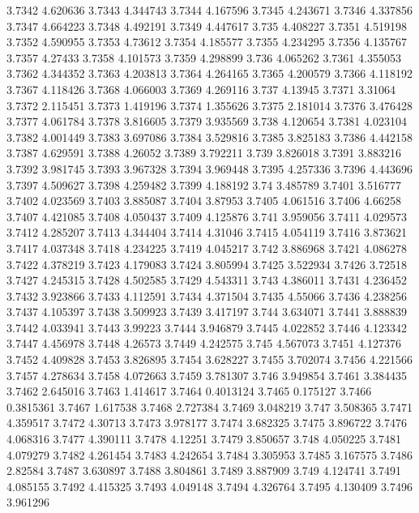 3.7342  4.620636
3.7343  4.344743
3.7344  4.167596
3.7345  4.243671
3.7346  4.337856
3.7347  4.664223
3.7348  4.492191
3.7349  4.447617
3.735  4.408227
3.7351  4.519198
3.7352  4.590955
3.7353  4.73612
3.7354  4.185577
3.7355  4.234295
3.7356  4.135767
3.7357  4.27433
3.7358  4.101573
3.7359  4.298899
3.736  4.065262
3.7361  4.355053
3.7362  4.344352
3.7363  4.203813
3.7364  4.264165
3.7365  4.200579
3.7366  4.118192
3.7367  4.118426
3.7368  4.066003
3.7369  4.269116
3.737  4.13945
3.7371  3.31064
3.7372  2.115451
3.7373  1.419196
3.7374  1.355626
3.7375  2.181014
3.7376  3.476428
3.7377  4.061784
3.7378  3.816605
3.7379  3.935569
3.738  4.120654
3.7381  4.023104
3.7382  4.001449
3.7383  3.697086
3.7384  3.529816
3.7385  3.825183
3.7386  4.442158
3.7387  4.629591
3.7388  4.26052
3.7389  3.792211
3.739  3.826018
3.7391  3.883216
3.7392  3.981745
3.7393  3.967328
3.7394  3.969448
3.7395  4.257336
3.7396  4.443696
3.7397  4.509627
3.7398  4.259482
3.7399  4.188192
3.74  3.485789
3.7401  3.516777
3.7402  4.023569
3.7403  3.885087
3.7404  3.87953
3.7405  4.061516
3.7406  4.66258
3.7407  4.421085
3.7408  4.050437
3.7409  4.125876
3.741  3.959056
3.7411  4.029573
3.7412  4.285207
3.7413  4.344404
3.7414  4.31046
3.7415  4.054119
3.7416  3.873621
3.7417  4.037348
3.7418  4.234225
3.7419  4.045217
3.742  3.886968
3.7421  4.086278
3.7422  4.378219
3.7423  4.179083
3.7424  3.805994
3.7425  3.522934
3.7426  3.72518
3.7427  4.245315
3.7428  4.502585
3.7429  4.543311
3.743  4.386011
3.7431  4.236452
3.7432  3.923866
3.7433  4.112591
3.7434  4.371504
3.7435  4.55066
3.7436  4.238256
3.7437  4.105397
3.7438  3.509923
3.7439  3.417197
3.744  3.634071
3.7441  3.888839
3.7442  4.033941
3.7443  3.99223
3.7444  3.946879
3.7445  4.022852
3.7446  4.123342
3.7447  4.456978
3.7448  4.26573
3.7449  4.242575
3.745  4.567073
3.7451  4.127376
3.7452  4.409828
3.7453  3.826895
3.7454  3.628227
3.7455  3.702074
3.7456  4.221566
3.7457  4.278634
3.7458  4.072663
3.7459  3.781307
3.746  3.949854
3.7461  3.384435
3.7462  2.645016
3.7463  1.414617
3.7464  0.4013124
3.7465  0.175127
3.7466  0.3815361
3.7467  1.617538
3.7468  2.727384
3.7469  3.048219
3.747  3.508365
3.7471  4.359517
3.7472  4.30713
3.7473  3.978177
3.7474  3.682325
3.7475  3.896722
3.7476  4.068316
3.7477  4.390111
3.7478  4.12251
3.7479  3.850657
3.748  4.050225
3.7481  4.079279
3.7482  4.261454
3.7483  4.242654
3.7484  3.305953
3.7485  3.167575
3.7486  2.82584
3.7487  3.630897
3.7488  3.804861
3.7489  3.887909
3.749  4.124741
3.7491  4.085155
3.7492  4.415325
3.7493  4.049148
3.7494  4.326764
3.7495  4.130409
3.7496  3.961296
